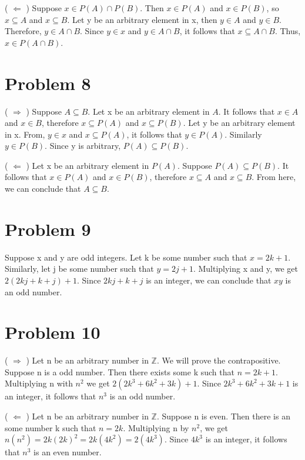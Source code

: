 \documentclass{article}
\begin{document}
( $\Leftarrow$ ) Suppose $x \in P(A) \cap P(B)$. Then $x \in P(A)$ and
$x \in P(B)$, so $x \subseteq A$ and $x \subseteq B$. Let y be an
arbitrary element in x, then $y \in A$ and $y \in B$. Therefore, $y
\in A \cap B$. Since $y \in x$ and $y \in A \cap B$, it follows that
$x \subseteq A \cap B$. Thus, $x \in P(A \cap B)$.

\section{Problem 8}

( $\Rightarrow$ ) Suppose $A \subseteq B$. Let x be an arbitrary
element in $A$. It follows that $x \in A$ and $x \in B$, therefore $x
\subseteq P(A)$ and $x \subseteq P(B)$. Let y be an arbitrary element
in x. From, $y \in x$ and $x \subseteq P(A)$, it follows that $y \in
P(A)$. Similarly $y \in P(B)$. Since y is arbitrary, $P(A) \subseteq
P(B)$.

( $\Leftarrow$ ) Let x be an arbitrary element in $P(A)$. Suppose
$P(A) \subseteq P(B)$. It follows that $x \in P(A)$ and $x \in P(B)$,
therefore $x \subseteq A$ and $x \subseteq B$. From here, we can
conclude that $A \subseteq B$.

\section{Problem 9}

Suppose x and y are odd integers. Let k be some number such that $x =
2k + 1$. Similarly, let j be some number such that $y = 2j + 1$.
Multiplying x and y, we get $2(2kj + k + j) + 1$. Since $2kj + k + j$
is an integer, we can conclude that $xy$ is an odd number.

\section{Problem 10}

( $\Rightarrow$ ) Let n be an arbitrary number in $ \mathbb{Z}$. We will prove
the contrapositive. Suppose n is a odd number. Then there exists some
k such that $n = 2k + 1$. Multiplying n with $n^2$ we get $2(2k^3 +
6k^2 + 3k) + 1$. Since $2k^3 + 6k^2 + 3k + 1$ is an integer, it
follows that $n^3$ is an odd number.

( $\Leftarrow$ ) Let n be an arbitrary number in $ \mathbb{Z} $. Suppose n is
even. Then there is an some number k such that $n = 2k$. Multiplying n
by $n^2$, we get $n(n^2) = 2k(2k)^2 = 2k(4k^2) = 2(4k^3)$. Since
$4k^3$ is an integer, it follows that $n^3$ is an even number.
\end{document}
